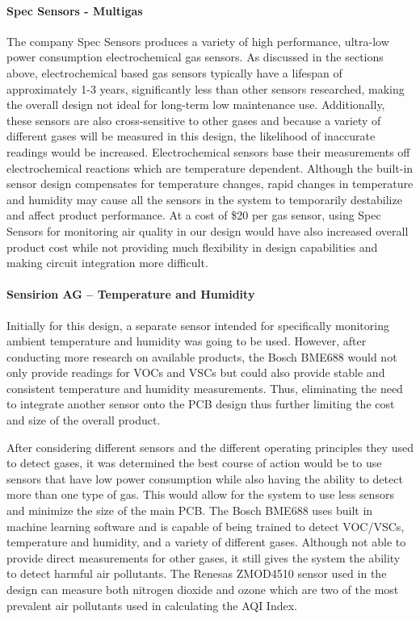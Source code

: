 \paragraph{ Spec Sensors - Multigas}
The company Spec Sensors produces a variety of high performance, ultra-low power consumption electrochemical gas sensors. As discussed in the sections above, electrochemical based gas sensors typically have a lifespan of approximately 1-3 years, significantly less than other sensors researched, making the overall design not ideal for long-term low maintenance use. Additionally, these sensors are also cross-sensitive to other gases and because a variety of different gases will be measured in this design, the likelihood of inaccurate readings would be increased. Electrochemical sensors base their measurements off electrochemical reactions which are temperature dependent. Although the built-in sensor design compensates for temperature changes, rapid changes in temperature and humidity may cause all the sensors in the system to temporarily destabilize and affect product performance. At a cost of \$20 per gas sensor, using Spec Sensors for monitoring air quality in our design would have also increased overall product cost while not providing much flexibility in design capabilities and making circuit integration more difficult. 

\paragraph{Sensirion AG – Temperature and Humidity}
Initially for this design, a separate sensor intended for specifically monitoring ambient temperature and humidity was going to be used. However, after conducting more research on available products, the Bosch BME688 would not only provide readings for VOCs and VSCs but could also provide stable and consistent temperature and humidity measurements. Thus, eliminating the need to integrate another sensor onto the PCB design thus further limiting the cost and size of the overall product. 

After considering different sensors and the different operating principles they used to detect gases, it was determined the best course of action would be to use sensors that have low power consumption while also having the ability to detect more than one type of gas. This would allow for the system to use less sensors and minimize the size of the main PCB. The Bosch BME688 uses built in machine learning software and is capable of being trained to detect VOC/VSCs, temperature and humidity, and a variety of different gases. Although not able to provide direct measurements for other gases, it still gives the system the ability to detect harmful air pollutants. The Renesas ZMOD4510 sensor used in the design can measure both nitrogen dioxide and ozone which are two of the most prevalent air pollutants used in calculating the AQI Index. 
